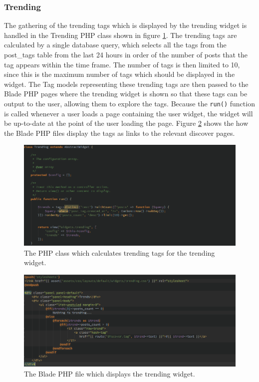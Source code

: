 \subsubsection{Trending}
The gathering of the trending tags which is displayed by the trending widget is handled in the Trending PHP class shown in figure \ref{fig:trending-class}. The trending tags are calculated by a single database query, which selects all the tags from the post\_tags table from the last 24 hours in order of the number of posts that the tag appears within the time frame. The number of tags is then limited to 10, since this is the maximum number of tags which should be displayed in the widget. The Tag models representing these trending tags are then passed to the Blade PHP pages where the trending widget is shown so that these tags can be output to the user, allowing them to explore the tags. Because the \texttt{run()} function is called whenever a user loads a page containing the user widget, the widget will be up-to-date at the point of the user loading the page. Figure \ref{fig:trending-blade} shows the how the Blade PHP files display the tags as links to the relevant discover pages.

\begin{figure}[H]
	\centering
	\includegraphics[width=\textwidth]{Images/Implementation/UI/Widgets/trending-class}
	\caption{The PHP class which calculates trending tags for the trending widget.}
	\label{fig:trending-class}
\end{figure}

\begin{figure}[H]
	\centering
	\includegraphics[width=\textwidth]{Images/Implementation/UI/Widgets/trending-blade}
	\caption{The Blade PHP file which displays the trending widget.}
	\label{fig:trending-blade}
\end{figure}

